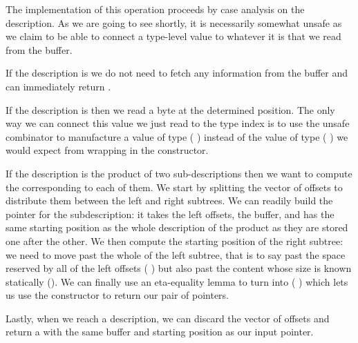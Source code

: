 The implementation of this operation proceeds by case analysis
on the description.
%
As we are going to see shortly, it is necessarily somewhat unsafe
as we claim to be able to connect a type-level value to whatever
it is that we read from the buffer.


If the description is  we do not need to fetch any
information from the buffer and can immediately return \IdrisData{()}.


If the description is  then we read a byte at the
determined position. The only way we can connect this value we just
read to the type index is to use the unsafe combinator
 to manufacture a value of type
( ) instead of the value of type
( )
we would expect from wrapping  in the  constructor.



If the description is the product of two sub-descriptions then we
want to compute the  corresponding to
each of them.
%
We start by splitting the vector of offsets to distribute them between
the left and right subtrees.
%
We can readily build the pointer for the  subdescription:
it takes the left offsets, the buffer, and has the same starting position
as the whole description of the product as they are stored one after the other.
%
We then compute the starting position of the right subtree: we need to
move past the whole of the left subtree, that is to say past the space
reserved by all of the left offsets ( )
but also past the content whose size is known statically ().
%
We can finally use an eta-equality lemma to turn  into
(  \IdrisData{\#}  )
which lets us use the  constructor \IdrisData{(\#)} to return our
pair of pointers.


Lastly, when we reach a  description, we can discard the
vector of offsets and return a  with the same buffer
and starting position as our input pointer.

